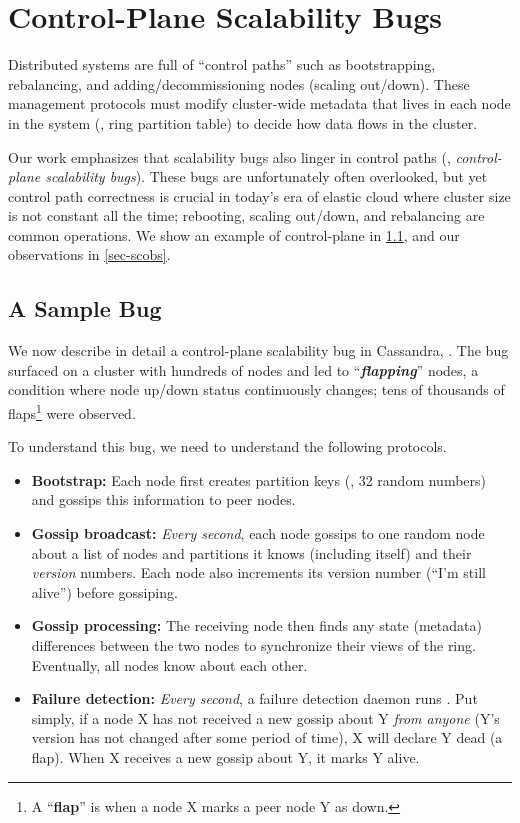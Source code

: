 \section{Control-Plane Scalability Bugs}

Distributed systems are full of ``control paths'' such as bootstrapping,
rebalancing, and adding/de\-com\-mission\-ing nodes (scaling out/down). These
management protocols must modify cluster-wide metadata that lives in each node
in the system (\eg, ring partition table) to decide how data flows in the
cluster. 

Our work emphasizes that scalability bugs also linger in control paths (\ie,
{\em control-plane scalability bugs}). These bugs are unfortunately often
overlooked, but yet control path correctness is crucial in today's era of
elastic cloud where cluster size is not constant all the time; rebooting,
scaling out/down, and rebalancing are common operations. We show an example of
control-plane in \sec\ref{sec-scbug}, and our observations in
\sec\ref{sec-scobs}.

\subsection{A Sample Bug}
\label{sec-scbug}

We now describe in detail a control-plane scalability bug in Cassandra,
 \cite{CA-One}.
%
The bug surfaced on a cluster with hundreds of nodes and led to
``\textit{\textbf{flapping}}'' nodes, a condition where node up/down status
continuously changes;  tens of thousands of flaps\footnote{A ``\textbf{flap}''
is when a node X marks a peer node Y as down.}  were observed.



To understand this bug, we need to understand the following protocols.
\begin{itemize}
\item {\bf Bootstrap:} Each node first creates partition keys (\eg, 32
random numbers) and gossips this information to peer nodes.
\item {\bf Gossip broadcast:} {\em Every second}, each node gossips to one 
random node about a list of nodes and partitions it knows (including
itself) and their {\em version} numbers.  Each node also increments its 
version number (``I'm still alive'') before gossiping.
\item {\bf Gossip processing:} The receiving node then finds any state
(metadata) differences between the two nodes to synchronize their views of
the ring.  Eventually, all nodes know about each other.
\item {\bf Failure detection:} {\em Every second}, a failure detection
daemon runs \cite{Lakshman+09-Cassandra}.  Put simply, if a node X has not 
received a new gossip about Y {\em from anyone} (Y's version has not 
changed after some period of time), X will declare Y dead (a flap).  When
X receives a new gossip about Y, it marks Y alive.
\end{itemize}


